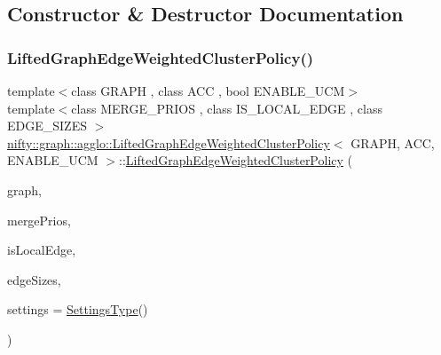 \subsection{Constructor \& Destructor Documentation}
\mbox{\label{classnifty_1_1graph_1_1agglo_1_1LiftedGraphEdgeWeightedClusterPolicy_a8380b58dc9e7c5b772af56a620c7946b}} 
\subsubsection{\texorpdfstring{Lifted\+Graph\+Edge\+Weighted\+Cluster\+Policy()}{LiftedGraphEdgeWeightedClusterPolicy()}\hspace{0.1cm}{\footnotesize\ttfamily [1/2]}}
{\footnotesize\ttfamily template$<$class G\+R\+A\+PH , class A\+CC , bool E\+N\+A\+B\+L\+E\+\_\+\+U\+CM$>$ \\
template$<$class M\+E\+R\+G\+E\+\_\+\+P\+R\+I\+OS , class I\+S\+\_\+\+L\+O\+C\+A\+L\+\_\+\+E\+D\+GE , class E\+D\+G\+E\+\_\+\+S\+I\+Z\+ES $>$ \\
\hyperlink{classnifty_1_1graph_1_1agglo_1_1LiftedGraphEdgeWeightedClusterPolicy}{nifty\+::graph\+::agglo\+::\+Lifted\+Graph\+Edge\+Weighted\+Cluster\+Policy}$<$ G\+R\+A\+PH, A\+CC, E\+N\+A\+B\+L\+E\+\_\+\+U\+CM $>$\+::\hyperlink{classnifty_1_1graph_1_1agglo_1_1LiftedGraphEdgeWeightedClusterPolicy}{Lifted\+Graph\+Edge\+Weighted\+Cluster\+Policy} (\begin{DoxyParamCaption}\item[{const \hyperlink{classnifty_1_1graph_1_1agglo_1_1LiftedGraphEdgeWeightedClusterPolicy_a09555efd4d9896f60e2225f905a6600c}{Graph\+Type} \&}]{graph,  }\item[{const M\+E\+R\+G\+E\+\_\+\+P\+R\+I\+OS \&}]{merge\+Prios,  }\item[{const I\+S\+\_\+\+L\+O\+C\+A\+L\+\_\+\+E\+D\+GE \&}]{is\+Local\+Edge,  }\item[{const E\+D\+G\+E\+\_\+\+S\+I\+Z\+ES \&}]{edge\+Sizes,  }\item[{const \hyperlink{structnifty_1_1graph_1_1agglo_1_1LiftedGraphEdgeWeightedClusterPolicy_1_1SettingsType}{Settings\+Type} \&}]{settings = {\ttfamily \hyperlink{structnifty_1_1graph_1_1agglo_1_1LiftedGraphEdgeWeightedClusterPolicy_1_1SettingsType}{Settings\+Type}()} }\end{DoxyParamCaption})\hspace{0.3cm}{\ttfamily [inline]}}

